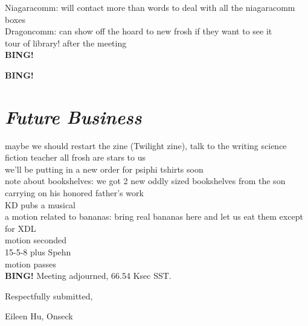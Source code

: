 \documentclass[10pt]{article}
\newcommand{\bing}{{\bf BING!} }
\newcommand{\goto}[1]{\bing \vskip 12pt \section*{{\em{#1}}}}
\newcommand{\ps}{ plus Spehn\xspace}
\newcommand{\onseck}{Eileen Hu, Onseck}
\begin{document}
Niagaracomm: will contact more than words to deal with all the niagaracomm boxes \\
Dragoncomm: can show off the hoard to new frosh if they want to see it \\

tour of library! after the meeting \\
\bing

\goto{Future Business}
maybe we should restart the zine (Twilight zine), talk to the writing science fiction teacher
all frosh are stars to us \\
we’ll be putting in a new order for psiphi tshirts soon \\
note about bookshelves: we got 2 new oddly sized bookshelves from the son carrying on his honored father’s work \\
KD pubs a musical \\

a motion related to bananas: bring real bananas here and let us eat them except for XDL \\
motion seconded \\
15-5-8\ps \\
motion passes \\
\bing
\noindent
Meeting adjourned, 66.54 Ksec SST.

\vspace{18pt}

\centerline{Respectfully submitted,}
\centerline{\onseck}
\end{document}
